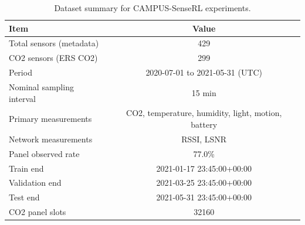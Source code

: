 \begin{table}[t]
\centering
\caption{Dataset summary for CAMPUS-SenseRL experiments.}
\label{tab:dataset}
\begin{tabular}{lc}
\toprule
Item & Value \\
\midrule
Total sensors (metadata) & 429 \\
CO2 sensors (ERS CO2) & 299 \\
Period & 2020-07-01 to 2021-05-31 (UTC) \\
Nominal sampling interval & 15 min \\
Primary measurements & CO2, temperature, humidity, light, motion, battery \\
Network measurements & RSSI, LSNR \\
Panel observed rate & 77.0\% \\
Train end & 2021-01-17 23:45:00+00:00 \\
Validation end & 2021-03-25 23:45:00+00:00 \\
Test end & 2021-05-31 23:45:00+00:00 \\
CO2 panel slots & 32160 \\
\bottomrule
\end{tabular}
\end{table}
